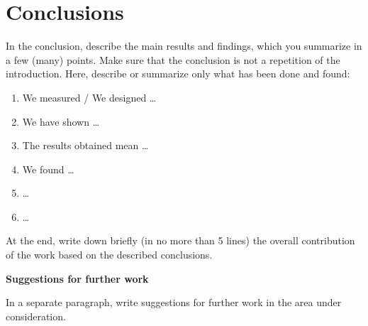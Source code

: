 \chapter{Conclusions}\label{cha:conclusions}

In the conclusion, describe the main results and findings, which you summarize in a few (many) points. Make sure that the conclusion is not a repetition of the introduction. Here, describe or summarize only what has been done and found:
\begin{enumerate}
\item We measured / We designed \ldots
\item We have shown \ldots
\item The results obtained mean \ldots
\item We found \ldots
\item \ldots
\item \ldots
\end{enumerate}

At the end, write down briefly (in no more than 5 lines) the overall contribution of the work based on the described conclusions.

\textbf{Suggestions for further work}

In a separate paragraph, write suggestions for further work in the area under consideration.
